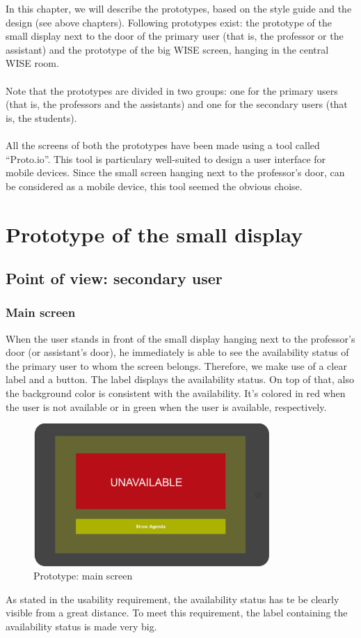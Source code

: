 \documentclass[11pt, a4paper,svglistings]{report}
\begin{document}
In this chapter, we will describe the prototypes, based on the style guide and the design (see above chapters). Following prototypes exist: the prototype of the small display next to the door of the primary user (that is, the professor or the assistant) and the prototype of the big WISE screen, hanging in the central WISE room. \\ \\
Note that the prototypes are divided in two groups: one for the primary users (that is, the professors and the assistants) and one for the secondary users (that is, the students). \\ \\
All the screens of both the prototypes have been made using a tool called ``Proto.io''. This tool is particulary well-suited to design a user interface for mobile devices. Since the small screen hanging next to the professor's door, can be considered as a mobile device, this tool seemed the obvious choise.

\section{Prototype of the small display}

\subsection{Point of view: secondary user}

\subsubsection{Main screen}

When the user stands in front of the small display hanging next to the professor's door (or assistant's door), he immediately is able to see the availability status of the primary user to whom the screen belongs. Therefore, we make use of a clear label and a button. The label displays the availability status. On top of that, also the background color is consistent with the availability. It's colored in red when the user is not available or in green when the user is available, respectively.

\begin{figure}[H]
\centering
    \includegraphics[width=0.8\textwidth]{Prototypes/MainScreen.png}
  \caption{Prototype: main screen}
\end{figure}
As stated in the usability requirement, the availability status has te be clearly visible from a great distance. To meet this requirement, the label containing the availability status is made very big.
\end{document}
